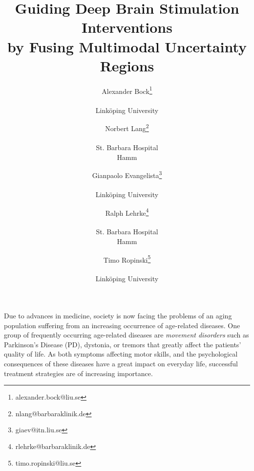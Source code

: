 \documentclass{vgtc}                          %
\title{Guiding Deep Brain Stimulation Interventions \\ by Fusing Multimodal Uncertainty Regions}
\author{Alexander Bock\thanks{alexander.bock@liu.se} \\ %
	\parbox{1in}{\scriptsize \centering Link\"oping University}
\and Norbert Lang\thanks{nlang@barbaraklinik.de} \\ %
	\parbox{1in}{\scriptsize \centering St. Barbara Hospital \\ Hamm}
\and Gianpaolo Evangelista\thanks{giaev@itn.liu.se} \\ %
	\parbox{1in}{\scriptsize \centering Link\"oping University}
\and Ralph Lehrke\thanks{rlehrke@barbaraklinik.de} \\ %
	\parbox{1in}{\scriptsize \centering St. Barbara Hospital \\ Hamm}
\and Timo Ropinski\thanks{timo.ropinski@liu.se} \\ %
	\parbox{1in}{\scriptsize \centering Link\"oping University}
}
\begin{document}
\label{sec:introduction}

\maketitle

Due to advances in medicine, society is now facing the problems of an aging population suffering from an increasing occurrence of age-related diseases. One group of frequently occurring age-related diseases are \emph{movement disorders} such as Parkinson's Disease (PD), dystonia, or tremors that greatly affect the patients' quality of life. As both symptoms affecting motor skills, and the psychological consequences of these diseases have a great impact on everyday life, successful treatment strategies are of increasing importance.
\end{document}
